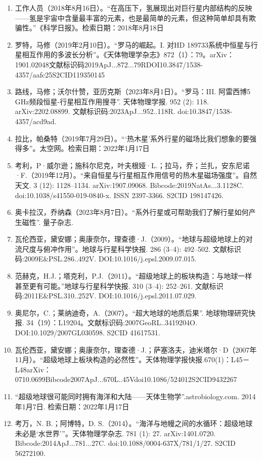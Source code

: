 \begin{enumerate}
\item 工作人员（2018年8月16日）。“在高压下，氢展现出对巨行星内部结构的反映——氢是宇宙中含量最丰富的元素，也是最简单的元素，但这种简单却具有欺骗性。”《科学日报》。检索日期：2018年8月18日
\item 罗特，马修（2019年2月10日）。“罗马的崛起。I. 对HD 189733系统中恒星与行星相互作用的多波长分析”。《天体物理学杂志》872（1）：79。arXiv：1901.02048文献标识码2019ApJ...872...79RDOI10.3847/1538-4357/aafc25S2CID119350145
\item 路线，马修；沃尔什赞，亚历克斯（2023年8月1日）。“罗马：III. 阿雷西博5 GHz频段恒星-行星相互作用搜寻”. 天体物理学报. 952 (2): 118. arXiv:2202.08899. 文献标识码:2023ApJ...952..118R. doi:10.3847/1538-4357/acd9ad.
\item 拉比，帕桑特（2019年7月29日）。“‘热木星’系外行星的磁场比我们想象的要强得多”。太空网。检索日期：2022年1月17日
\item 考利，P·威尔逊；施科尔尼克，叶夫根娅·L.；拉马，乔；兰扎，安东尼诺·F.（2019年12月）。“来自恒星与行星相互作用信号的热木星磁场强度”。自然天文. 3 (12): 1128–1134. arXiv:1907.09068. Bibcode:2019NatAs...3.1128C. doi:10.1038/s41550-019-0840-x. ISSN 2397-3366. S2CID 198147426.
\item 奥卡拉汉，乔纳森（2023年8月7日）。“系外行星或可帮助我们了解行星如何产生磁性”. 量子杂志.
\item 瓦伦西亚，黛安娜；奥康奈尔，理查德·J.（2009）。“地球与超级地球上的对流尺度与俯冲作用”。地球与行星科学快报. 286 (3–4): 492–502. 文献标识码:2009E&PSL.286..492V. DOI:10.1016/j.epsl.2009.07.015.
\item 范赫克，H.J.；塔克利，P.J.（2011）。“超级地球上的板块构造：与地球一样甚至更有可能。”地球与行星科学快报. 310 (3–4): 252–261. 文献标识码:2011E&PSL.310..252V. DOI:10.1016/j.epsl.2011.07.029.
\item 奥尼尔，C.；莱纳迪奇，A.（2007）。“超大地球的地质后果”. 地球物理研究快报. 34（19）：L19204。文献标识码:2007GeoRL..3419204O. DOI:10.1029/2007GL030598. S2CID 41617531.
\item 瓦伦西亚，黛安娜；奥康奈尔，理查德·J.；萨塞洛夫，迪米塔尔·D（2007年11月）。“超级地球上板块构造的必然性”。天体物理学报快报.670(1)：L45－L48arXiv：0710.0699Bibcode2007ApJ...670L..45Vdoi10.1086/524012S2CID9432267
\item “超级地球很可能同时拥有海洋和大陆——天体生物学”.astrobiology.com. 2014年1月7日. 检索日期：2022年1月17日
\item 考万，N. B.；阿博特，D. S.（2014）。“海洋与地幔之间的水循环：超级地球未必是‘水世界’”。天体物理学杂志. 781 (1): 27. arXiv:1401.0720. Bibcode:2014ApJ...781...27C. doi:10.1088/0004-637X/781/1/27. S2CID 56272100.

\end{enumerate}
